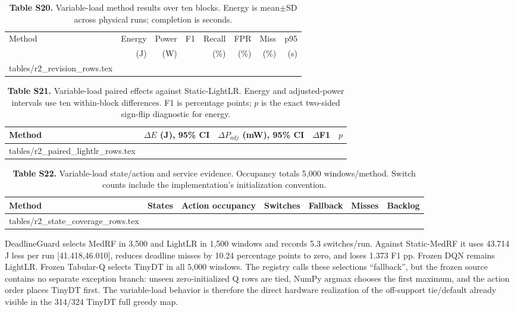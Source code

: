 \documentclass[10pt,a4paper]{article}
\makeatletter
\newcommand{\tableinput}[1]{\@@input #1.tex }
\makeatother
\begin{document}
\begin{table}[h!]
\centering\footnotesize
\caption*{\textbf{Table S20.} Variable-load method results over ten blocks. Energy is mean$\pm$SD across physical runs; completion is seconds.}
\setlength{\tabcolsep}{2.6pt}
\begin{tabular}{lrrrrrrr}\toprule
Method & Energy & Power & F1 & Recall & FPR & Miss & p95\\
 & (J) & (W) & & (\%) & (\%) & (\%) & (s)\\\midrule
\tableinput{tables/r2_revision_rows}
\bottomrule\end{tabular}
\end{table}

\begin{table}[h!]
\centering\scriptsize
\caption*{\textbf{Table S21.} Variable-load paired effects against Static-LightLR. Energy and adjusted-power intervals use ten within-block differences. F1 is percentage points; $p$ is the exact two-sided sign-flip diagnostic for energy.}
\setlength{\tabcolsep}{2.5pt}
\begin{tabular}{lrrrr}\toprule
Method & $\Delta E$ (J), 95\% CI & $\Delta P_{adj}$ (mW), 95\% CI & $\Delta$F1 & $p$\\\midrule
\tableinput{tables/r2_paired_lightlr_rows}
\bottomrule\end{tabular}
\end{table}

\begin{table}[h!]
\centering\scriptsize
\caption*{\textbf{Table S22.} Variable-load state/action and service evidence. Occupancy totals 5,000 windows/method. Switch counts include the implementation's initialization convention.}
\setlength{\tabcolsep}{2.2pt}
\begin{tabular}{lrlrrrr}\toprule
Method & States & Action occupancy & Switches & Fallback & Misses & Backlog\\\midrule
\tableinput{tables/r2_state_coverage_rows}
\bottomrule\end{tabular}
\end{table}

DeadlineGuard selects MedRF in 3,500 and LightLR in 1,500 windows and records 5.3 switches/run. Against Static-MedRF it uses 43.714 J less per run [41.418,46.010], reduces deadline misses by 10.24 percentage points to zero, and loses 1.373 F1 pp. Frozen DQN remains LightLR. Frozen Tabular-Q selects TinyDT in all 5,000 windows. The registry calls these selections ``fallback'', but the frozen source contains no separate exception branch: unseen zero-initialized Q rows are tied, NumPy argmax chooses the first maximum, and the action order places TinyDT first. The variable-load behavior is therefore the direct hardware realization of the off-support tie/default already visible in the 314/324 TinyDT full greedy map.
\end{document}
